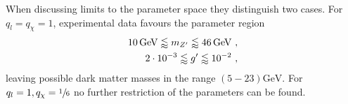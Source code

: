 When discussing limits to the parameter space they distinguish two cases. For $q_l=q_\chi=1$, experimental data favours the parameter region
\begin{align}\label{eq:Boundg}
	\SI{10}{\giga\electronvolt}\lessapprox m_{Z'} \lessapprox\SI{46}{\giga\electronvolt} \ , \notag \\
	\SI{2e-3}{}\lessapprox g' \lessapprox\SI{e-2}{} \ ,
\end{align}
leaving possible dark matter masses in the range $(5-23)\si{\giga\electronvolt}$. For $q_l=1,q_\chi=\sfrac{1}{6}$ no further restriction of the parameters can be found.

